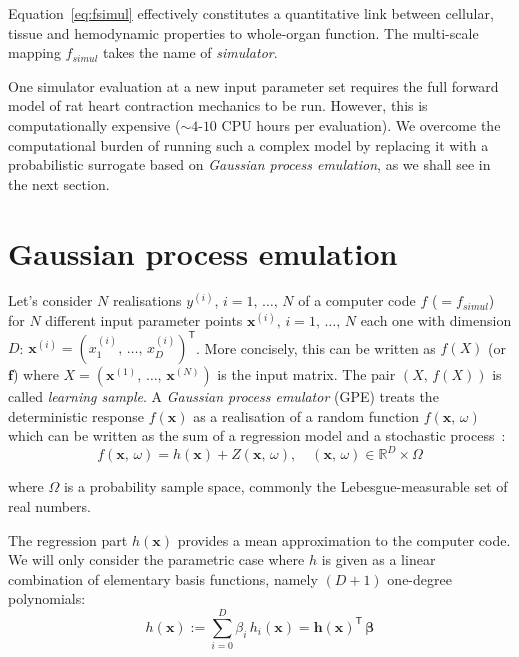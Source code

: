 \noindent
Equation~\eqref{eq:fsimul} effectively constitutes a quantitative link between cellular, tissue and hemodynamic properties to whole-organ function. The multi-scale mapping $f_{simul}$ takes the name of \textit{simulator}.

\vspace{0.2cm}
One simulator evaluation at a new input parameter set requires the full forward model of rat heart contraction mechanics to be run. However, this is computationally expensive ($\sim 4$-$10$ CPU hours per evaluation). We overcome the computational burden of running such a complex model by replacing it with a probabilistic surrogate based on \textit{Gaussian process emulation}, as we shall see in the next section.


%
%
%
\section{Gaussian process emulation}\label{sec:ch3gaussianprocessemulation}
Let's consider $N$ realisations $y^{(i)},\,i=1,\,\dots,\,N$ of a computer code $f$ ($=f_{simul}$) for $N$ different input parameter points $\mathbf{x}^{(i)},\,i=1,\,\dots,\,N$ each one with dimension $D$: $\mathbf{x}^{(i)}=(x_{1}^{(i)},\,\dots,\,x_{D}^{(i)})^\mathsf{T}$. More concisely, this can be written as $f(X)$ (or $\mathbf{f}$) where $X=(\mathbf{x}^{(1)},\,\dots,\,\mathbf{x}^{(N)})$ is the input matrix. The pair $(X,\,f(X))$ is called \textit{learning sample}. A \textit{Gaussian process emulator} (\acs{GPE}) treats the deterministic response $f(\mathbf{x})$ as a realisation of a random function $f(\mathbf{x},\,\omega)$ which can be written as the sum of a regression model and a stochastic process~\cite{OHagan:2006}:
\begin{equation}
    f(\mathbf{x},\,\omega) = h(\mathbf{x}) + Z(\mathbf{x},\,\omega), \quad (\mathbf{x},\,\omega)\in\mathbb{R}^D\times\Omega
\end{equation}

\noindent
where $\Omega$ is a probability sample space, commonly the Lebesgue-measurable set of real numbers.

\vspace{0.2cm}
The regression part $h(\mathbf{x})$ provides a mean approximation to the computer code. We will only consider the parametric case where $h$ is given as a linear combination of elementary basis functions, namely $(D+1)$ one-degree polynomials:
%
\begin{equation}
    h(\mathbf{x}):=\sum_{i=0}^D\beta_i\,h_i(\mathbf{x}) = \mathbf{h}(\mathbf{x})^\mathsf{T}\,\boldsymbol{\beta}
\end{equation}

